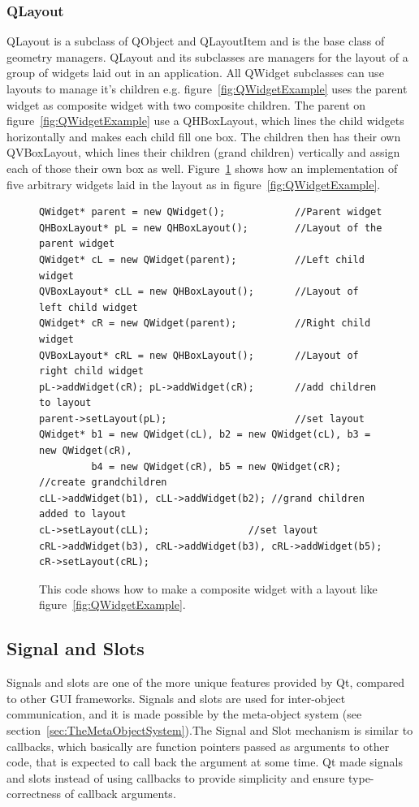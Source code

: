 \subsubsection{QLayout}
\label{sec:QLayout}
QLayout is a subclass of QObject and QLayoutItem and is the base class of geometry managers. QLayout and its subclasses are managers for the layout of a group of widgets laid out in an application. All QWidget subclasses can use layouts to manage it's children e.g. figure~\ref{fig:QWidgetExample} uses the parent widget as composite widget with two composite children. The parent on figure~\ref{fig:QWidgetExample} use a QHBoxLayout, which lines the child widgets horizontally and makes each child fill one box. The children then has their own QVBoxLayout, which lines their children (grand children) vertically and assign each of those their own box as well. Figure~\ref{fig:QLayoutCode} shows how an implementation of five arbitrary widgets laid in the layout as in figure~\ref{fig:QWidgetExample}.

\begin{figure}[h]
\centering
\lstset{language=C++} 
\begin{lstlisting}[frame=single]  
QWidget* parent = new QWidget();  			//Parent widget
QHBoxLayout* pL = new QHBoxLayout();		//Layout of the parent widget
QWidget* cL = new QWidget(parent); 			//Left child widget
QVBoxLayout* cLL = new QHBoxLayout();		//Layout of left child widget
QWidget* cR = new QWidget(parent); 			//Right child widget
QVBoxLayout* cRL = new QHBoxLayout();		//Layout of right child widget
pL->addWidget(cR); pL->addWidget(cR);		//add children to layout
parent->setLayout(pL);						//set layout
QWidget* b1 = new QWidget(cL), b2 = new QWidget(cL), b3 = new QWidget(cR),
		 b4 = new QWidget(cR), b5 = new QWidget(cR); //create grandchildren
cLL->addWidget(b1), cLL->addWidget(b2);	//grand children added to layout
cL->setLayout(cLL);					//set layout
cRL->addWidget(b3), cRL->addWidget(b3), cRL->addWidget(b5);				 
cR->setLayout(cRL);			 
\end{lstlisting}
\caption{This code shows how to make a composite widget with a layout like figure~\ref{fig:QWidgetExample}.}
\label{fig:QLayoutCode} 	
\end{figure}


\subsection{Signal and Slots}
\label{sec:signalandslots}
Signals and slots are one of the more unique features provided by Qt, compared to other GUI frameworks. Signals and slots are used for inter-object communication, and it is made possible by the meta-object system (see section~\ref{sec:TheMetaObjectSystem}).The Signal and Slot mechanism is similar to callbacks, which basically are function pointers passed as arguments to other code, that is expected to call back the argument at some time. Qt made signals and slots instead of using callbacks to provide simplicity and ensure type-correctness of callback arguments.

